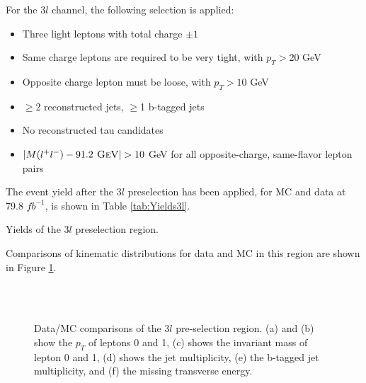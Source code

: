 For the $3l$ channel, the following selection is applied:

\begin{itemize}
  \item Three light leptons with total charge $\pm 1$
  \item Same charge leptons are required to be very tight, with $p_T > 20$ GeV
  \item Opposite charge lepton must be loose, with $p_T > 10$ GeV
  \item $\geq$2 reconstructed jets, $\geq$1 b-tagged jets                                              
  \item No reconstructed tau candidates
  \item $|M(l^+l^-)-91.2\textsc{ GeV}| > 10$ GeV for all opposite-charge, same-flavor lepton pairs
\end{itemize}

The event yield after the $3l$ preselection has been applied, for MC and data at 79.8 $fb^{-1}$, is shown in Table \ref{tab:Yields3l}.

\begin{table}[H]

\label{tab:Yields3l}
\caption{Yields of the $3l$ preselection region.}
\end{table}

Comparisons of kinematic distributions for data and MC in this region are shown in Figure \ref{fig:presel3l}.

\begin{figure}[H]
    \centering
    \\                             
    \\                         
    \caption{Data/MC comparisons of the $3l$ pre-selection region. (a) and (b) show the $p_T$ of leptons 0 and 1, (c) shows the invariant mass of lepton 0 and 1, (d) shows the jet multiplicity, (e) the b-tagged jet multiplicity, and (f) the missing transverse energy.}
    \label{fig:presel3l}                                                                                          
\end{figure}

